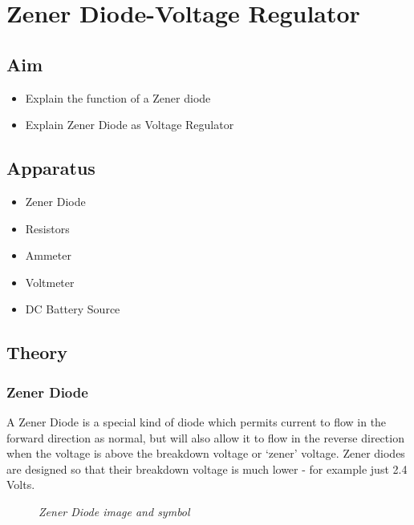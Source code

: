 \chapter{Zener Diode-Voltage Regulator}
	\section{Aim}
		\begin{itemize}
			\tightlist
			\item Explain the function of a Zener diode
			\item Explain Zener Diode as Voltage Regulator
		\end{itemize}
	
	\section{Apparatus}
		\begin{itemize}
			\tightlist
			\item Zener Diode
			\item Resistors
			\item Ammeter
			\item Voltmeter
			\item DC Battery Source
		\end{itemize}
	
	\section{Theory}
		\subsection{Zener Diode}
			A Zener Diode is a special kind of diode which permits current to flow in the forward direction as normal, but will also allow it to flow in the reverse direction when the voltage is above the breakdown voltage or ‘zener’ voltage. Zener diodes are designed so that their breakdown voltage is much lower - for example just 2.4 Volts.
			\begin{figure}[ht]
				\centering 
				\hfill
				\caption{\textit{Zener Diode image and symbol}}
			\end{figure}
		
